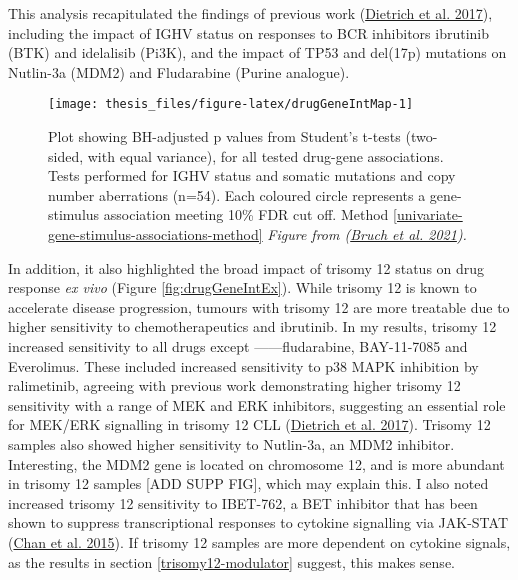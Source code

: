 \documentclass[11pt, a4paper, twosided]{book}
\begin{document}
This analysis recapitulated the findings of previous work (\protect\hyperlink{ref-JCIpaper}{Dietrich et al. 2017}), including the impact of IGHV status on responses to BCR inhibitors ibrutinib (BTK) and idelalisib (Pi3K), and the impact of TP53 and del(17p) mutations on Nutlin-3a (MDM2) and Fludarabine (Purine analogue).


\begin{figure}

{\centering \texttt{[image: thesis\_files/figure-latex/drugGeneIntMap-1]} 

}

\caption{Plot showing BH-adjusted p values from Student's t-tests (two-sided, with equal variance), for all tested drug-gene associations. Tests performed for IGHV status and somatic mutations and copy number aberrations (n=54). Each coloured circle represents a gene-stimulus association meeting 10\% FDR cut off. Method \ref{univariate-gene-stimulus-associations-method} \emph{Figure from (\protect\hyperlink{ref-Giles2021}{Bruch et al. 2021}).}}\label{fig:drugGeneIntMap}
\end{figure}
In addition, it also highlighted the broad impact of trisomy 12 status on drug response \emph{ex vivo} (Figure \ref{fig:drugGeneIntEx}). While trisomy 12 is known to accelerate disease progression, tumours with trisomy 12 are more treatable due to higher sensitivity to chemotherapeutics and ibrutinib. In my results, trisomy 12 increased sensitivity to all drugs except ------fludarabine, BAY-11-7085 and Everolimus. These included increased sensitivity to p38 MAPK inhibition by ralimetinib, agreeing with previous work demonstrating higher trisomy 12 sensitivity with a range of MEK and ERK inhibitors, suggesting an essential role for MEK/ERK signalling in trisomy 12 CLL (\protect\hyperlink{ref-JCIpaper}{Dietrich et al. 2017}). Trisomy 12 samples also showed higher sensitivity to Nutlin-3a, an MDM2 inhibitor. Interesting, the MDM2 gene is located on chromosome 12, and is more abundant in trisomy 12 samples {[}ADD SUPP FIG{]}, which may explain this. I also noted increased trisomy 12 sensitivity to IBET-762, a BET inhibitor that has been shown to suppress transcriptional responses to cytokine signalling via JAK-STAT (\protect\hyperlink{ref-Chan2015}{Chan et al. 2015}). If trisomy 12 samples are more dependent on cytokine signals, as the results in section \ref{trisomy12-modulator} suggest, this makes sense.
\end{document}
